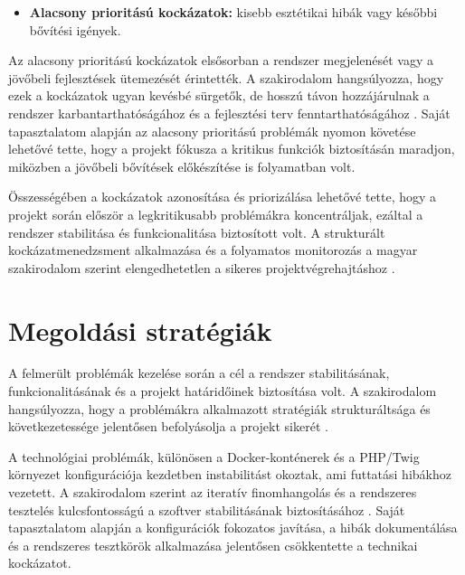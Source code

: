 \begin{itemize}
    \item \textbf{Alacsony prioritású kockázatok:} kisebb esztétikai hibák vagy későbbi bővítési igények.
\end{itemize}

Az alacsony prioritású kockázatok elsősorban a rendszer megjelenését vagy a jövőbeli fejlesztések 
ütemezését érintették. A szakirodalom hangsúlyozza, hogy ezek a kockázatok ugyan kevésbé sürgetők, 
de hosszú távon hozzájárulnak a rendszer karbantarthatóságához és a fejlesztési terv fenntarthatóságához \cite{Szalay2018,Kaposi2019}. 
Saját tapasztalatom alapján az alacsony prioritású problémák nyomon követése lehetővé tette, hogy 
a projekt fókusza a kritikus funkciók biztosításán maradjon, miközben a jövőbeli bővítések előkészítése is folyamatban volt.

Összességében a kockázatok azonosítása és priorizálása lehetővé tette, hogy a projekt során először 
a legkritikusabb problémákra koncentráljak, ezáltal a rendszer stabilitása és funkcionalitása biztosított volt. 
A strukturált kockázatmenedzsment alkalmazása és a folyamatos monitorozás a magyar szakirodalom szerint 
elengedhetetlen a sikeres projektvégrehajtáshoz \cite{Hajdu2014,Kovacs2016,Szalay2018,Kaposi2019}.


\section{Megoldási stratégiák}

A felmerült problémák kezelése során a cél a rendszer stabilitásának, funkcionalitásának és a projekt határidőinek biztosítása volt. 
A szakirodalom hangsúlyozza, hogy a problémákra alkalmazott stratégiák strukturáltsága és 
következetessége jelentősen befolyásolja a projekt sikerét \cite{Hajdu2014,Szalay2018,Kaposi2019}.

A technológiai problémák, különösen a Docker-konténerek és a PHP/Twig környezet konfigurációja 
kezdetben instabilitást okoztak, ami futtatási hibákhoz vezetett. A szakirodalom szerint az iteratív 
finomhangolás és a rendszeres tesztelés kulcsfontosságú a szoftver stabilitásának biztosításához \cite{Kovacs2016}. 
Saját tapasztalatom alapján a konfigurációk fokozatos javítása, a hibák dokumentálása és a rendszeres tesztkörök alkalmazása jelentősen csökkentette a technikai kockázatot.

